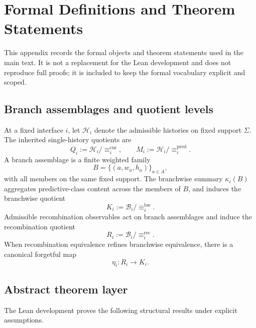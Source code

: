 \documentclass[11pt]{article}
\theoremstyle{definition}
\begin{document}
\appendix
\section{Formal Definitions and Theorem Statements}

This appendix records the formal objects and theorem statements used in the main text. It is not a replacement for the Lean development and does not reproduce full proofs; it is included to keep the formal vocabulary explicit and scoped.

\subsection{Branch assemblages and quotient levels}

At a fixed interface \(i\), let \(\mathcal H_i\) denote the admissible histories on fixed support \(\Sigma\). The inherited single-history quotients are
\[
Q_i := \mathcal H_i / {\equiv_i^{\mathrm{cur}}},
\qquad
M_i := \mathcal H_i / {\equiv_i^{\mathrm{pred}}}.
\]
A branch assemblage is a finite weighted family
\[
B=\{(a,w_a,h_a)\}_{a\in A},
\]
with all members on the same fixed support. The branchwise summary \(\kappa_i(B)\) aggregates predictive-class content across the members of \(B\), and induces the branchwise quotient
\[
K_i := \mathcal B_i / {\equiv_i^{\mathrm{bw}}}.
\]
Admissible recombination observables act on branch assemblages and induce the recombination quotient
\[
R_i := \mathcal B_i / {\equiv_i^{\mathrm{rec}}}.
\]
When recombination equivalence refines branchwise equivalence, there is a canonical forgetful map
\[
\eta_i : R_i \to K_i.
\]

\subsection{Abstract theorem layer}

The Lean development proves the following structural results under explicit assumptions.
\end{document}
